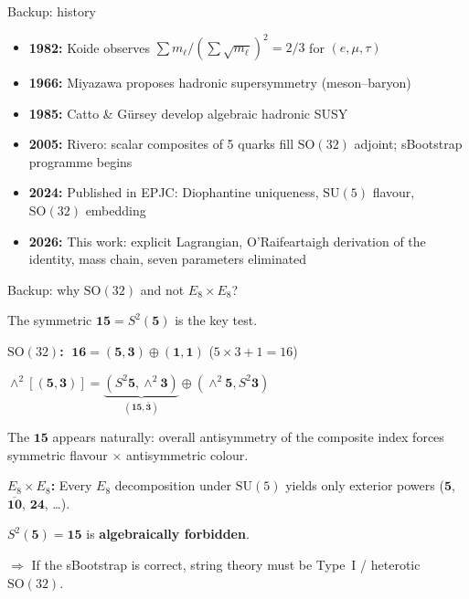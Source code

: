 \documentclass[aspectratio=169,12pt]{beamer}
\begin{document}
\begin{frame}{Backup: history}

\begin{itemize}
\item \textbf{1982:} Koide observes
$\sum m_\ell / (\sum\sqrt{m_\ell})^2 = 2/3$ for $(e,\mu,\tau)$

\item \textbf{1966:} Miyazawa proposes hadronic supersymmetry
(meson--baryon)

\item \textbf{1985:} Catto \& G\"ursey develop algebraic
hadronic SUSY

\item \textbf{2005:} Rivero: scalar composites of 5 quarks
fill $\mathrm{SO}(32)$ adjoint; sBootstrap programme begins

\item \textbf{2024:} Published in EPJC: Diophantine uniqueness,
$\mathrm{SU}(5)$ flavour, $\mathrm{SO}(32)$ embedding

\item \textbf{2026:} This work: explicit Lagrangian,
O'Raifeartaigh derivation of the identity, mass chain,
seven parameters eliminated
\end{itemize}

\end{frame}

\begin{frame}{Backup: why $\mathrm{SO}(32)$ and not $E_8 \times E_8$?}

The symmetric $\mathbf{15} = S^2(\mathbf{5})$ is the key test.

\bigskip
\textbf{$\mathrm{SO}(32)$:} $\;\mathbf{16} = (\mathbf{5},\mathbf{3})
\oplus (\mathbf{1},\mathbf{1})$ \quad ($5\times 3 + 1 = 16$)

$\wedge^2[(\mathbf{5},\mathbf{3})]
= \underbrace{(S^2\mathbf{5},\wedge^2\mathbf{3})}_{(\mathbf{15},\bar{\mathbf{3}})}
\oplus (\wedge^2\mathbf{5}, S^2\mathbf{3})$

The $\mathbf{15}$ appears naturally: overall antisymmetry of
the composite index forces symmetric flavour $\times$
antisymmetric colour.

\bigskip
\textbf{$E_8 \times E_8$:} Every $E_8$ decomposition under
$\mathrm{SU}(5)$ yields only exterior powers
($\mathbf{5}$, $\overline{\mathbf{10}}$, $\mathbf{24}$, \ldots).

$S^2(\mathbf{5}) = \mathbf{15}$ is \textbf{algebraically forbidden}.

\bigskip
$\Longrightarrow$ If the sBootstrap is correct,
string theory must be Type~I / heterotic $\mathrm{SO}(32)$.

\end{frame}
\end{document}
